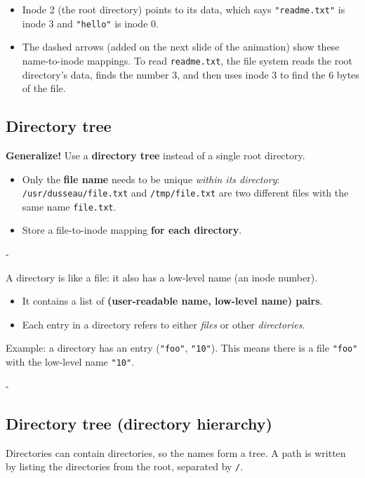 \documentclass[11pt,a4paper]{article}
\makeatletter
\newcommand{\keepspace}[1]{\par\penalty-100\begingroup
  \setlength{\dimen@}{#1}\dimen@ii\pagegoal\advance\dimen@ii-\pagetotal
  \ifdim\dimen@>\dimen@ii\ifdim\dimen@ii>\z@\vfil\fi\break\fi\endgroup}
\makeatother
\begin{document}
\begin{itemize}
  \item Inode 2 (the root directory) points to its data, which says
        \texttt{"readme.txt"} is inode 3 and \texttt{"hello"} is inode 0.
  \item The dashed arrows (added on the next slide of the animation) show
        these name-to-inode mappings. To read
        \texttt{readme.txt}, the file system reads the root directory's data,
        finds the number 3, and then uses inode 3 to find the 6 bytes of the
        file.
\end{itemize}

\subsection{Directory tree}

\textbf{Generalize!} Use a \textbf{directory tree} instead of a single root
directory.
\begin{itemize}
  \item Only the \textbf{file name} needs to be unique \emph{within its
        directory}: \texttt{/usr/dusseau/file.txt} and
        \texttt{/tmp/file.txt} are two different files with the same name
        \texttt{file.txt}.
  \item Store a file-to-inode mapping \textbf{for each directory}.
\end{itemize}

\keepspace{7\baselineskip}
\begin{defbox}[Directory]
A directory is like a file: it also has a low-level name (an inode number).
\begin{itemize}
  \item It contains a list of \textbf{(user-readable name, low-level name)
        pairs}.
  \item Each entry in a directory refers to either \emph{files} or other
        \emph{directories}.
\end{itemize}
Example: a directory has an entry (\texttt{"foo"}, \texttt{"10"}). This means
there is a file \texttt{"foo"} with the low-level name \texttt{"10"}.
\end{defbox}

\keepspace{7\baselineskip}
\subsection{Directory tree (directory hierarchy)}

Directories can contain directories, so the names form a tree. A path is
written by listing the directories from the root, separated by
\texttt{/}.
\end{document}
